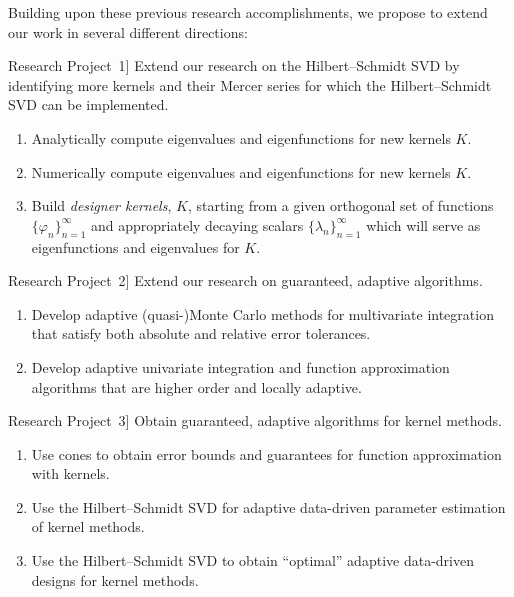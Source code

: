 \documentclass[11pt]{NSFamsart}
\newcommand{\refproba}{\hyperref[SectHSSVD]{Research Project~1}\xspace}
\newcommand{\refprobb}{\hyperref[SectGAIL]{Research Project~2}\xspace}
\newcommand{\refprobc}{\hyperref[combinesec]{Research Project~3}\xspace}
\begin{document}
Building upon these previous research accomplishments, we propose to extend our work in several different directions:

\begin{description}[leftmargin=2.5ex]

\item[\refproba] Extend our research on the Hilbert--Schmidt SVD by identifying more kernels and their Mercer series for which the Hilbert--Schmidt SVD can be implemented.
\begin{enumerate}
\renewcommand{\labelenumi}{1.\arabic{enumi}.}
\item Analytically compute eigenvalues and eigenfunctions for new kernels $K$.
\item Numerically compute eigenvalues and eigenfunctions for new kernels $K$.
\item Build \emph{designer kernels}, $K$, starting from a given orthogonal set of functions $\{\varphi_n\}_{n=1}^\infty$ and appropriately decaying scalars $\{\lambda_n\}_{n=1}^\infty$ which will serve as eigenfunctions and eigenvalues for $K$.
\end{enumerate}

\item[\refprobb] Extend our research on guaranteed, adaptive algorithms.
\begin{enumerate}
\renewcommand{\labelenumi}{2.\arabic{enumi}.}
\item Develop adaptive (quasi-)Monte Carlo methods for multivariate integration that satisfy both absolute and relative error tolerances.
\item Develop adaptive univariate integration and function approximation algorithms that are higher order and locally adaptive.
\end{enumerate}

\item[\refprobc] Obtain guaranteed, adaptive algorithms for kernel methods.
\begin{enumerate}
\renewcommand{\labelenumi}{3.\arabic{enumi}.}
\item Use cones to obtain error bounds and guarantees for function approximation with kernels.
\item Use the Hilbert--Schmidt SVD for adaptive data-driven parameter estimation of kernel methods.
\item Use the Hilbert--Schmidt SVD to obtain ``optimal'' adaptive data-driven designs for kernel methods.
\end{enumerate}


\end{description}
\end{document}
